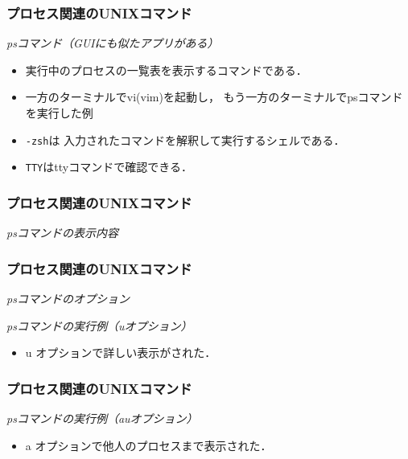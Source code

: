 \documentclass{beamer}                 %
\begin{document}
\begin{frame}[fragile]
  \frametitle{プロセス関連のUNIXコマンド}
  \emph{psコマンド（GUIにも似たアプリがある）}
  \begin{itemize}
  \item 実行中のプロセスの一覧表を表示するコマンドである．
  \item 一方のターミナルでvi(vim)を起動し，
    もう一方のターミナルでpsコマンドを実行した例
  \item \texttt{-zsh}は
    入力されたコマンドを解釈して実行するシェルである．
  \item \texttt{TTY}はttyコマンドで確認できる．
  \end{itemize}
\end{frame}

\begin{frame}[fragile]
  \frametitle{プロセス関連のUNIXコマンド}
  \emph{psコマンドの表示内容}
\end{frame}

\begin{frame}[fragile]
  \frametitle{プロセス関連のUNIXコマンド}
  \emph{psコマンドのオプション}

  \emph{psコマンドの実行例（uオプション）}

  \begin{itemize}
  \item u オプションで詳しい表示がされた．
  \end{itemize}
\end{frame}

\begin{frame}[fragile]
  \frametitle{プロセス関連のUNIXコマンド}
  \emph{psコマンドの実行例（auオプション）}

  \begin{itemize}
  \item a オプションで他人のプロセスまで表示された．
  \end{itemize}
\end{frame}
\end{document}
